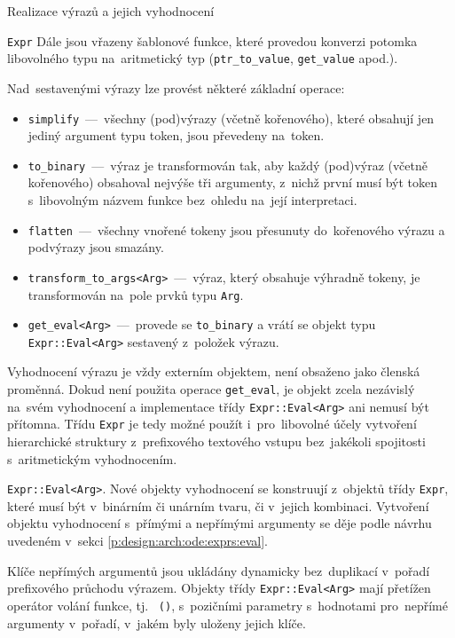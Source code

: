 \documentclass[thesis=M,czech]{FITthesis}[2012/06/26]
\newcommand{\id}[1]{\texttt{#1}}
\newcommand{\rf}[1]{\ref{#1}}
\begin{document}
\begin{section}{Realizace výrazů a jejich vyhodnocení}
\begin{paragraph}{\id{Expr}}
Dále jsou vřazeny šablonové funkce,
které provedou konverzi potomka libovolného typu
na~aritmetický typ (\id{ptr\_\-to\_\-value}, \id{get\_\-value} apod.).

Nad~sestavenými výrazy lze provést některé základní operace:
\begin{itemize}
\item \id{simplify}~---~všechny (pod)výrazy (včetně kořenového),
   které obsahují jen jediný argument typu token,
   jsou převedeny na~token.
\item \id{to\_\-binary}~---~výraz je transformován tak,
   aby každý (pod)výraz (včetně kořenového)
   obsahoval nejvýše tři argumenty,
   z~nichž první musí být token s~libovolným názvem funkce
   bez~ohledu na~její interpretaci.
\item \id{flatten}~---~všechny vnořené tokeny jsou přesunuty
   do~kořenového výrazu a podvýrazy jsou smazány.
\item \id{transform\_\-to\_\-args<Arg>}~---~výraz,
   který obsahuje výhradně tokeny,
   je transformován na~pole prvků typu \id{Arg}.
\item \id{get\_\-eval<Arg>}~---~provede se \id{to\_\-binary}
   a vrátí se objekt typu \id{Expr::\-Eval<Arg>}
   sestavený z~položek výrazu.
\end{itemize}

Vyhodnocení výrazu je vždy externím objektem,
není obsaženo jako členská proměnná.
Dokud není použita operace \id{get\_\-eval},
je objekt zcela nezávislý na~svém vyhodnocení
a implementace třídy \id{Expr::\-Eval<Arg>} ani nemusí být přítomna.
Třídu \id{Expr} je tedy možné použít
i~pro~libovolné účely vytvoření hierarchické struktury
z~prefixového textového vstupu
bez~jakékoli spojitosti s~aritmetickým vyhodnocením.
\end{paragraph} %


\begin{paragraph}{\id{Expr::\-Eval<Arg>}.}\label{p:impl:exprs:eval}
Nové objekty vyhodnocení se konstruují z~objektů třídy \id{Expr},
které musí být v~binárním či unárním tvaru, či v~jejich kombinaci.
Vytvoření objektu vyhodnocení s~přímými a nepřímými argumenty
se děje podle návrhu uvedeném
v~sekci \rf{p:design:arch:ode:exprs:eval}.

Klíče nepřímých argumentů jsou ukládány dynamicky bez~duplikací
v~pořadí prefixového průchodu výrazem.
Objekty třídy \id{Expr::\-Eval<Arg>} mají přetížen operátor
volání funkce, tj.~ \id{()}, s~pozičními parametry
s~hodnotami pro~nepřímé argumenty v~pořadí,
v~jakém byly uloženy jejich klíče.


\end{paragraph}
\end{section}
\end{document}
